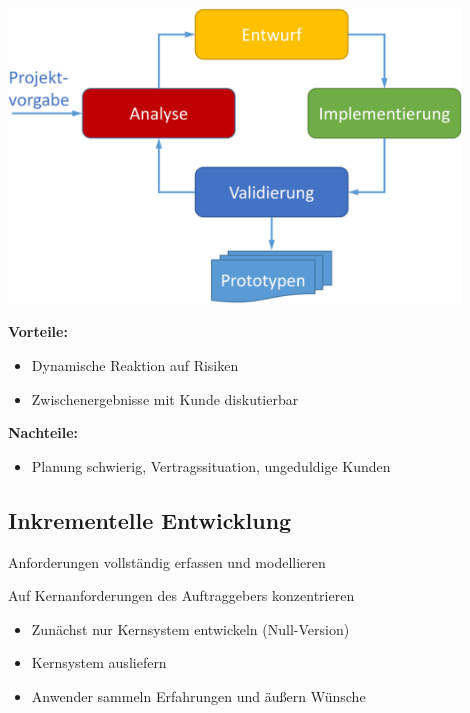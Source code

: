 \documentclass[11pt, a4paper]{article}
\begin{document}
\begin{minipage}[h]{0.45\textwidth}
    \centering \includegraphics[width=0.9\textwidth]{Vorgehen-04.png} 
    \raggedright
\end{minipage}
\begin{minipage}[h]{0.45\textwidth}
    \tiny
    \textbf{Vorteile:}
    \begin{itemize}
        \item Dynamische Reaktion auf Risiken 
        \item Zwischenergebnisse mit Kunde diskutierbar
    \end{itemize}
    
    \textbf{Nachteile:}
    \begin{itemize}
        \item Planung schwierig, Vertragssituation, ungeduldige Kunden
    \end{itemize}
\end{minipage}

\normalsize

\newpage

\subsection{Inkrementelle Entwicklung}

Anforderungen vollständig erfassen und modellieren

Auf Kernanforderungen des Auftraggebers konzentrieren

\begin{itemize}
    \item Zunächst nur Kernsystem entwickeln (Null-Version)
    \item Kernsystem ausliefern
    \item Anwender sammeln Erfahrungen und äußern Wünsche
\end{itemize}
\end{document}
